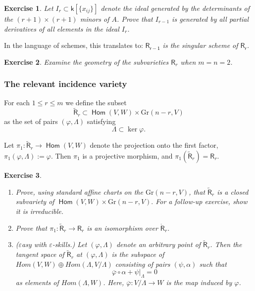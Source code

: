\documentclass[11pt]{article}
\newcommand{\Gr}{\textrm{Gr}}
\renewcommand{\k}{\mathsf{k}}
\renewcommand{\to}{\longrightarrow}
\DeclareMathOperator{\Hom}{\mathsf{Hom}}
\renewcommand{\k}{\mathsf{k}}
\DeclareMathOperator{\Gr}{Gr}
\renewcommand{\to}{{\longrightarrow}}
\newtheorem{exercise}{Exercise}[section]
\begin{document}
\begin{exercise}
Let \(I_{r} \subset \k[\{ x_{ij}\}]\) denote the ideal generated by the determinants of the \((r+1) \times (r+1)\) minors of \(A\).  Prove that \(I_{r-1}\) is generated by all partial derivatives of all elements in the ideal \(I_{r}\).
\end{exercise}


In the language of schemes, this translates to: \emph{\(\mathsf{R_{r-1}}\) is
the singular scheme of \(\mathsf{R_{r}}\).}






\begin{exercise}
Examine the geometry of the subvarieties \(\mathsf{R}_{r}\) when \(m=n=2\).
\end{exercise}

\subsubsection{The relevant incidence variety}
\label{sec:orgcbe6583}
For each \(1 \leq r \leq m\) we define the subset 
\[\widetilde{\mathsf{R}}_{r} \subset \Hom(V,W) \times \Gr(n-r,V)\] as the set of pairs \((\varphi, \Lambda)\)  satisfying  \[ \Lambda \subset \ker \varphi.\]


Let \(\pi_{1}: \widetilde{\mathsf{R}}_{r} \to \Hom(V,W)\) denote the projection onto the first factor, \(\pi_{1}(\varphi, \Lambda) := \varphi\).  Then \(\pi_{1}\) is a projective morphism, and \(\pi_{1}(\widetilde{\mathsf{R}}_{r}) = \mathsf{R}_{r}\).


\begin{exercise}
\begin{enumerate}
\item Prove, using standard affine charts on the \(\Gr(n-r,V)\), that \(\widetilde{\mathsf{R}}_{r}\) is a closed subvariety of \(\Hom(V,W) \times \Gr(n-r,V).\)  For a follow-up exercise, show it is irreducible.
\item Prove that \(\pi_{1}: \widetilde{\mathsf{R}}_{r} \to \mathsf{R}_{r}\) is an isomorphism over \(\mathring{\mathsf{R}}_{r}\).
\item (\(\varepsilon\)asy  with \(\varepsilon\)-skills.) Let \((\varphi, \Lambda)\) denote an arbitrary point of \(\widetilde{\mathsf{R}}_{r}\). Then the tangent space of \(\widetilde{\mathsf{R}}_{r}\) at \((\varphi, \Lambda)\) is the subspace of   \(Hom(V,W) \oplus Hom(\Lambda, V/\Lambda)\) consisting of pairs \((\psi,\alpha)\) such that \[\overline{\varphi} \circ \alpha + \psi|_{\Lambda} = 0\] as elements of \(Hom(\Lambda, W)\).  Here, \(\overline{\varphi}: V /\Lambda \to W\) is the map induced by \(\varphi\).
\end{enumerate}
\end{exercise}
\end{document}
